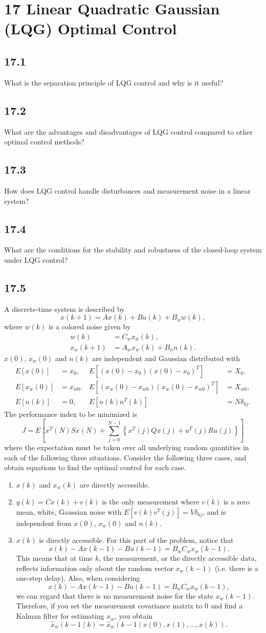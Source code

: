 \documentclass{article}
\newcommand{\problem}[2]{\subsection*{#1}}
\begin{document}
\section*{17 Linear Quadratic Gaussian (LQG) Optimal Control}

\problem{17.1}{lqg-concepts}
What is the separation principle of LQG control and why is it useful?

\problem{17.2}{lqg-concepts}
What are the advantages and disadvantages of LQG control compared to other optimal control methods?

\problem{17.3}{lqg-concepts}
How does LQG control handle disturbances and measurement noise in a linear system?

\problem{17.4}{lqg-concepts}
What are the conditions for the stability and robustness of the closed-loop system under LQG control?

\problem{17.5}{}
A discrete-time system is described by
\[
x(k + 1) = Ax(k) + Bu(k) + B_w w(k),
\]
where $w(k)$ is a colored noise given by
\[
\begin{aligned}
w(k) &= C_w x_w(k), \\
x_w(k + 1) &= A_w x_w(k) + B_n n(k).
\end{aligned}
\]
$x(0)$, $x_w(0)$ and $n(k)$ are independent and Gaussian distributed with
\[
\begin{aligned}
E[x(0)] &= x_0, & E\left[(x(0) - x_0)(x(0) - x_0)^T\right] &= X_0, \\
E[x_w(0)] &= x_{w0}, & E\left[(x_w(0) - x_{w0})(x_w(0) - x_{w0})^T\right] &= X_{w0}, \\
E[n(k)] &= 0, & E\left[n(k)n^T(k)\right] &= N\delta_{kj}.
\end{aligned}
\]
The performance index to be minimized is
\[
J = E\left[x^T(N)Sx(N) + \sum_{j=0}^{N-1} \left\{x^T(j)Qx(j) + u^T(j)Ru(j)\right\}\right]
\]
where the expectation must be taken over all underlying random quantities in each of the following three situations. Consider the following three cases, and obtain equations to find the optimal control for each case.
\begin{enumerate}
\item $x(k)$ and $x_w(k)$ are directly accessible.
\item $y(k) = Cx(k) + v(k)$ is the only measurement where $v(k)$ is a zero mean, white, Gaussian noise with $E[v(k)v^T(j)] = V\delta_{kj}$, and is independent from $x(0)$, $x_w(0)$ and $n(k)$.
\item $x(k)$ is directly accessible. For this part of the problem, notice that
\[
x(k) - Ax(k - 1) - Bu(k - 1) = B_w C_w x_w(k - 1).
\]
This means that at time $k$, the measurement, or the directly accessible data, reflects information only about the random vector $x_w(k - 1)$ (i.e. there is a one-step delay). Also, when considering
\[
x(k) - Ax(k - 1) - Bu(k - 1) = B_w C_w x_w(k - 1),
\]
we can regard that there is no measurement noise for the state $x_w(k - 1)$. Therefore, if you set the measurement covariance matrix to 0 and find a Kalman filter for estimating $x_w$, you obtain
\[
\widehat{x}_w(k - 1 \mid k) = \widehat{x}_w(k - 1 \mid x(0), x(1), \dots, x(k)).
\]
\end{enumerate}
\end{document}
